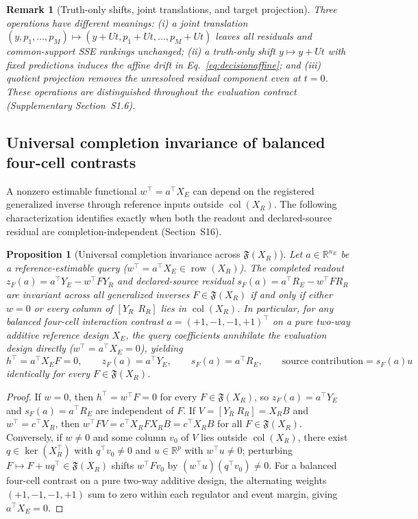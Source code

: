 \documentclass[preprint,12pt,number,sort&compress]{elsarticle}
\newtheorem{proposition}{Proposition}
\newtheorem{remark}{Remark}
\newcommand{\R}{\mathbb{R}}
\DeclareMathOperator{\col}{col}
\DeclareMathOperator{\row}{row}
\begin{document}
\begin{remark}[Truth-only shifts, joint translations, and target projection]
Three operations have different meanings: (i) a joint translation $(y,p_1,\ldots,p_M)\mapsto(y+Ut,p_1+Ut,\ldots,p_M+Ut)$ leaves all residuals and common-support SSE rankings unchanged; (ii) a truth-only shift $y\mapsto y+Ut$ with fixed predictions induces the affine drift in Eq.~\eqref{eq:decisionaffine}; and (iii) quotient projection removes the unresolved residual component even at $t=0$. These operations are distinguished throughout the evaluation contract (Supplementary Section~S1.6).
\end{remark}

\subsection{Universal completion invariance of balanced four-cell contrasts}\label{subsec:independence}
A nonzero estimable functional $w^\top=a^\top X_E$ can depend on the registered generalized inverse through reference inputs outside $\col(X_R)$. The following characterization identifies exactly when both the readout and declared-source residual are completion-independent (Section~S16).

\begin{proposition}[Universal completion invariance across $\mathfrak{F}(X_R)$]\label{prop:fourcell}
Let $a \in \R^{n_E}$ be a reference-estimable query ($w^\top = a^\top X_E \in \row(X_R)$). The completed readout $z_F(a) = a^\top Y_E - w^\top F Y_R$ and declared-source residual $s_F(a) = a^\top R_E - w^\top F R_R$ are invariant across all generalized inverses $F \in \mathfrak{F}(X_R)$ if and only if either $w = 0$ or every column of $[Y_R\ \ R_R]$ lies in $\col(X_R)$. In particular, for any balanced four-cell interaction contrast $a = (+1, -1, -1, +1)^\top$ on a pure two-way additive reference design $X_E$, the query coefficients annihilate the evaluation design directly ($w^\top = a^\top X_E = 0$), yielding
\[
h^\top = a^\top X_E F = 0, \qquad z_F(a) = a^\top Y_E, \qquad s_F(a)=a^\top R_E,\qquad \text{source contribution}=s_F(a)u
\]
identically for every $F \in \mathfrak{F}(X_R)$.
\end{proposition}
\begin{proof}
If $w = 0$, then $h^\top = w^\top F = 0$ for every $F \in \mathfrak{F}(X_R)$, so $z_F(a) = a^\top Y_E$ and $s_F(a) = a^\top R_E$ are independent of $F$. If $V = [Y_R\ R_R] = X_R B$ and $w^\top = c^\top X_R$, then $w^\top F V = c^\top X_R F X_R B = c^\top X_R B$ for all $F \in \mathfrak{F}(X_R)$. Conversely, if $w \neq 0$ and some column $v_0$ of $V$ lies outside $\col(X_R)$, there exist $q \in \ker(X_R^\top)$ with $q^\top v_0 \neq 0$ and $u \in \R^p$ with $w^\top u \neq 0$; perturbing $F \mapsto F + u q^\top \in \mathfrak{F}(X_R)$ shifts $w^\top F v_0$ by $(w^\top u)(q^\top v_0) \neq 0$. For a balanced four-cell contrast on a pure two-way additive design, the alternating weights $(+1,-1,-1,+1)$ sum to zero within each regulator and event margin, giving $a^\top X_E = 0$.
\end{proof}
\end{document}
